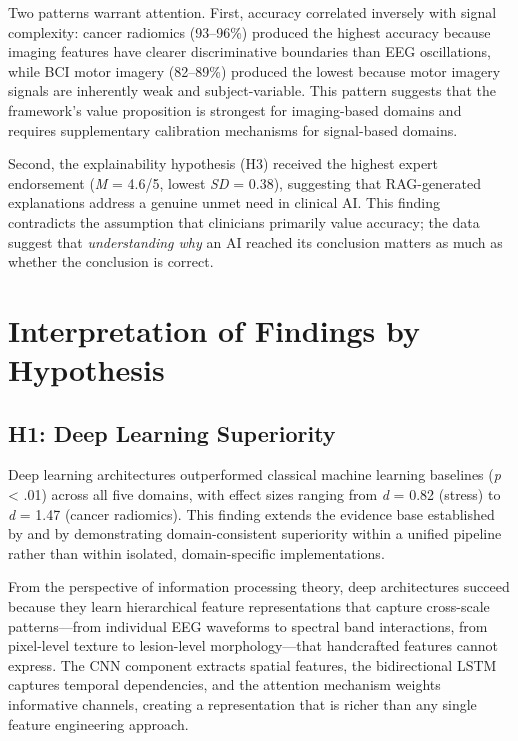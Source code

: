 Two patterns warrant attention. First, accuracy correlated inversely with signal complexity: cancer radiomics (93--96\%) produced the highest accuracy because imaging features have clearer discriminative boundaries than EEG oscillations, while BCI motor imagery (82--89\%) produced the lowest because motor imagery signals are inherently weak and subject-variable. This pattern suggests that the framework's value proposition is strongest for imaging-based domains and requires supplementary calibration mechanisms for signal-based domains.

Second, the explainability hypothesis (H3) received the highest expert endorsement (\textit{M} = 4.6/5, lowest \textit{SD} = 0.38), suggesting that RAG-generated explanations address a genuine unmet need in clinical AI. This finding contradicts the assumption that clinicians primarily value accuracy; the data suggest that \textit{understanding why} an AI reached its conclusion matters as much as whether the conclusion is correct.


\section{Interpretation of Findings by Hypothesis}
\label{sec:interpretation}

\subsection{H1: Deep Learning Superiority}

Deep learning architectures outperformed classical machine learning baselines (\textit{p} < .01) across all five domains, with effect sizes ranging from \textit{d} = 0.82 (stress) to \textit{d} = 1.47 (cancer radiomics). This finding extends the evidence base established by \citet{lecun2015deep} and \citet{goodfellow2016deep} by demonstrating domain-consistent superiority within a unified pipeline rather than within isolated, domain-specific implementations.

From the perspective of information processing theory, deep architectures succeed because they learn hierarchical feature representations that capture cross-scale patterns---from individual EEG waveforms to spectral band interactions, from pixel-level texture to lesion-level morphology---that handcrafted features cannot express. The CNN component extracts spatial features, the bidirectional LSTM captures temporal dependencies, and the attention mechanism weights informative channels, creating a representation that is richer than any single feature engineering approach.

